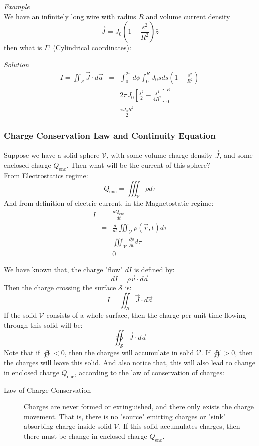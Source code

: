 \documentclass[12pt,a4paper,twoside]{article}
\numberwithin{equation}{section}
\begin{document}
    \noindent\textit{Example}\\
    \noindent We have an infinitely long wire with radius $R$ and volume current density
    \[\overrightarrow{J}=J_0\left(1-\frac{s^2}{R^2}\right)\hat{z}\]
    then what is $I$? (Cylindrical coordinates):
    
    \noindent \textit{Solution}
    \begin{eqnarray*}
        I = \iint_{\mathcal{S}}\overrightarrow{J}\cdot d\overrightarrow{a} &=& \int_{0}^{2\pi}d\phi\int_{0}^{R}J_0 sds\left(1-\frac{s^2}{R^2}\right)\\
        &=& 2\pi J_0\left[\frac{s^2}{2}-\frac{s^4}{4R^2}\right]^{R}_{0}\\
        &=& \frac{\pi J_0 R^2}{2}
    \end{eqnarray*}
    
\subsubsection{Charge Conservation Law and Continuity Equation}
Suppose we have a solid sphere $\mathcal{V}$, with some volume charge density $\overrightarrow{J}$, and some enclosed charge $Q_{\mathrm{enc}}$. Then what will be the current of this sphere?\\

\noindent From Electrostatics regime:
\[Q_{\mathrm{enc}}=\iiint_{\mathcal{V}} \rho d\tau\]
And from definition of electric current, in the Magnetostatic regime:
\begin{eqnarray*}
I &=& \frac{dQ_{\mathrm{enc}}}{dt}\\
&=&\frac{d}{dt}\iiint_\mathcal{V} \rho(\overrightarrow{r}, t) d\tau\\
&=&\iiint_\mathcal{V}\frac{\partial \rho}{\partial t}d\tau\\
&=& 0
\end{eqnarray*}

\noindent We have known that, the charge "flow" $dI$ is defined by:
\[dI=\rho\overrightarrow{v}\cdot d\overrightarrow{a}\]
Then the charge crossing the surface $\mathcal{S}$ is:
\[I=\iint_\mathcal{S}\overrightarrow{J}\cdot d\overrightarrow{a}\]
If the solid $\mathcal{V}$ consists of a whole surface, then the charge per unit time flowing through this solid will be:
\[\oiint_{\mathcal{S}}\overrightarrow{J}\cdot d\overrightarrow{a}\]
Note that if $\oiint<0$, then the charges will accumulate in solid $\mathcal{V}$. If $\oiint>0$, then the charges will leave this solid. And also notice that, this will also lead to change in enclosed charge $Q_{\mathrm{enc}}$, according to the law of conservation of charges:\
\begin{description}
    \item[Law of Charge Conservation] Charges are never formed or extinguished, and there only exists the charge movement. That is, there is no "source" emitting charges or "sink" absorbing charge inside solid $\mathcal{V}$. If this solid accumulates charges, then there must be change in enclosed charge $Q_{\mathrm{enc}}$.
\end{description}
\end{document}
